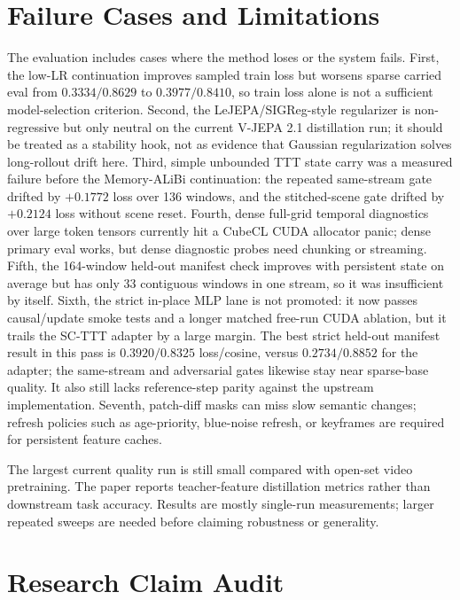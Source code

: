 \documentclass[10pt]{article}
\begin{document}
\section{Failure Cases and Limitations}

The evaluation includes cases where the method loses or the system fails.
First, the low-LR continuation improves sampled train loss but worsens sparse
carried eval from $0.3334/0.8629$ to $0.3977/0.8410$, so train loss alone is
not a sufficient model-selection criterion.  Second, the LeJEPA/SIGReg-style
regularizer is non-regressive but only neutral on the current V-JEPA 2.1
distillation run; it should be treated as a stability hook, not as evidence
that Gaussian regularization solves long-rollout drift here.  Third, simple
unbounded TTT state carry was a measured failure before the Memory-ALiBi
continuation: the repeated same-stream gate drifted by $+0.1772$ loss over 136
windows, and the stitched-scene gate drifted by $+0.2124$ loss without scene
reset.  Fourth, dense full-grid temporal diagnostics over large token tensors
currently hit a CubeCL CUDA allocator panic; dense primary eval works, but
dense diagnostic probes need chunking or streaming.  Fifth, the 164-window
held-out manifest check improves with persistent state on average but has only
33 contiguous windows in one stream, so it was insufficient by itself.  Sixth,
the strict in-place MLP lane is not promoted: it now passes causal/update smoke
tests and a longer matched free-run CUDA ablation, but it trails the SC-TTT
adapter by a large margin.  The best strict held-out manifest result in this
pass is $0.3920/0.8325$ loss/cosine, versus $0.2734/0.8852$ for the adapter;
the same-stream and adversarial gates likewise stay near sparse-base quality.
It also still lacks reference-step parity against the upstream implementation.
Seventh, patch-diff masks can miss slow semantic changes; refresh policies such
as age-priority, blue-noise refresh, or keyframes are required for persistent
feature caches.

The largest current quality run is still small compared with open-set video
pretraining.  The paper reports teacher-feature distillation metrics rather
than downstream task accuracy.  Results are mostly single-run measurements;
larger repeated sweeps are needed before claiming robustness or generality.

\section{Research Claim Audit}
\end{document}
